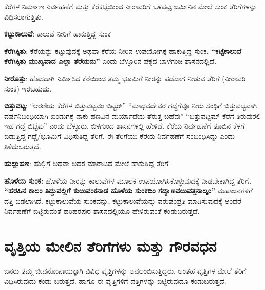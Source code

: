 ಕೆರೆಗಳ ನಿರ್ಮಾಣ ನಿರ್ವಹಣೆಗೆ ಮತ್ತು ಕೆರೆಕಟ್ಟೆಯಿಂದ ನೀರಾವರಿಗೆ ಒಳಪಟ್ಟ ಜಮೀನಿನ ಮೇಲೆ ಸುಂಕ ತೆರಿಗೆಗಳನ್ನು ವಿಧಿಸಲಾಗುತ್ತಿತು.

\textbf{ಕಟ್ಟುಕಾಲುವೆ}: ಕಾಲುವೆ ನೀರಿಗೆ ಹಾಕುತ್ತಿದ್ದ ಸುಂಕ

\textbf{ಕೆರೆಗಿಕ್ಕಿತು}: ಕೆರೆಯನ್ನು ಕಟ್ಟುವುದಕ್ಕೆ ಅಥವಾ ಕೆರೆಯ ನೀರಿನ ಉಪಯೋಗಕ್ಕೆ ಹಾಕುತ್ತಿದ್ದ ಸುಂಕ. \textbf{“ಕಟ್ಟೆಕಾಲುವೆ ಕೆರೆಗಿಕ್ಕಿತು ಮುಖ್ಯವಾದ ಎಲ್ಲಾ ತೆರೆಯನು”} ಎಂದು ಬೆಳ್ಳೂರಿನ ಪಕ್ಕದ ಬಾಳಗಂಚಿ ಶಾಸನದಲ್ಲಿದೆ.

\textbf{ನೀರೊತ್ತು}: ಹೊಸದಾಗಿ ನಿರ್ಮಿಸಿದ ಕೆರೆಯಿಂದ ತಮ್ಮ ಭೂಮಿಗೆ ನೀರನ್ನು ಪಡೆದಾಗ ನೀಡುವ ತೆರಿಗೆ (ನೀರಾವರಿ ಸುಂಕ) ಇರಬಹುದು.

\textbf{ಬಿತ್ತುವಟ್ಟ}: “ಆರಣಿಯ ಕೆರೆಗಳ ಬಿತ್ತುವಟ್ಟವಂ ಬಿಟ್ಟರ್​” “ಮಾಧವದೇವರ ಗದ್ದೆಗೆವೂ ನೀರು ಸಂಧಿಗೆ ಬಿತ್ತುವಟ್ಟವಾಗಿ ವರ್ಷನಿಬಂಧಿಯಾಗಿ ಖಂಡುಗಕ್ಕೆ ನಾಕು ಹಣವಿನ ಮರ್ಯಾದೆಯ ತೆರುತ್ತ ಬಹೆವು” “ಬಿತ್ತುವಟ್ಟಮ್ ಕೆರೆಗೆ ತಿರುವುರಲಿ ಇಹ ಗದ್ದೆ ಬಿಟ್ಟೆವು” ಎಂದು ಬೆಳ್ಳೂರು, ಬಿಳಗುಂದ ಶಾಸನಗಳಲ್ಲಿ ಹೇಳಿದೆ. ಕೆರೆಯ ನಿರ್ವಹಣೆಗೆ ತೂಬಿನ ಕೆಳಗೆ ಬಿಡುತ್ತಿದ್ದ ಗದ್ದೆ/ಭೂಮಿಗೆ ವಿಧಿಸುತಿದ್ದ ತೆರಿಗೆ. ಈ ತೆರಿಗೆಯು ಕೆರೆಯ ನಿರ್ವಹಣೆಗೆ ಸಂಬಂಧಿಸಿದ್ದು ಎಂದು ತಿಳಿದುಬರುತ್ತದೆ.

\textbf{ಹುಲ್ಲುಹಣ}: ಹುಲ್ಲಿಗೆ ಅಥವಾ ಅದರ ಮಾರಾಟದ ಮೇಲೆ ಹಾಕುತ್ತಿದ್ದ ತೆರಿಗೆ

\textbf{ಹೊಳೆಯ ಸುಂಕ: } ಹೊಳೆಯ ನೀರನ್ನು ಕಾಲುವೆಗಳ ಮೂಲಕ ಉಪಯೋಗಿಸಿಕೊಳ್ಳುವುದಕ್ಕೆ ನೀಡಬೇಕಾಗಿದ್ದ ತೆರಿಗೆ\textbf{. “ಹರಹಿನ ಕಾಲಂ ತಿದ್ದುವಲ್ಲಿಗೆ ಕುಱುವಂಕನಾಡ ಹೊಳೆಯ ಸುಂಕದಿಂ ಗದ್ಯಾಣವಱುವತ್ತನಾಲ್ಕಂ” }ಮಹಾಜನಗಳಿಗೆ ದತ್ತಿ ಬಿಡಲಾಗಿದೆ. ಕಟ್ಟುಕಾಲುವೆಯ ಸುಂಕವನ್ನು, ಕಟ್ಟುಕಾಲುವೆಯನ್ನು ವರುಷಂಪ್ರತಿ ಮಾಡಿಸುವುದಕ್ಕೆ ಅಂದರೆ ನಿರ್ವಹಣೆಗೆ ಬಿಟ್ಟಿರುವಂತೆ ಹರಿಹರಪುರ ಶಾಸನದಲ್ಲಿಯೂ ಹೇಳಿರುವಂತೆ ಕಂಡುಬರುತ್ತದೆ.


\section{ವೃತ್ತಿಯ ಮೇಲಿನ ತೆರಿಗೆಗಳು ಮತ್ತು ಗೌರವಧನ}

ಜನರು ತಮ್ಮ ಜೀವನೋಪಾಯಕ್ಕಾಗಿ ವಿವಿಧ ವೃತ್ತಿಗಳನ್ನು ಅವಲಂಬಿಸುತ್ತಿದ್ದರು. ಅಂತಹ ವೃತ್ತಿಗಳ ಮೇಲೆ ತೆರಿಗೆ ವಿಧಿಸಿರುವುದು ಕಂಡು ಬರುತ್ತದೆ. ಹಾಗೂ ಈ ವೃತ್ತಿಗಳಿಗೆ ದತ್ತಿಗಳನ್ನು ಬಿಟ್ಟಿರುವುದೂ ಕಂಡುಬರುತ್ತದೆ.

